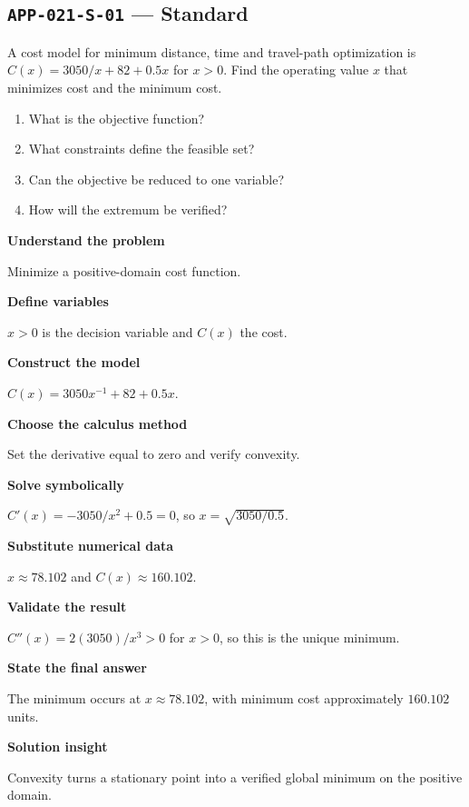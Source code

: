 \documentclass[11pt]{book}
\newcommand{\pid}[1]{\texttt{#1}}
\begin{document}
\subsection*{\pid{APP-021-S-01} — Standard}
\begin{problembox}
A cost model for minimum distance, time and travel-path optimization is $C(x)=3050/x+82+0.5x$ for $x>0$. Find the operating value $x$ that minimizes cost and the minimum cost.
\end{problembox}
\begin{promptbox}\begin{enumerate}
\item What is the objective function?
\item What constraints define the feasible set?
\item Can the objective be reduced to one variable?
\item How will the extremum be verified?
\end{enumerate}\end{promptbox}
\begin{solutionbox}
\textbf{Understand the problem}\par Minimize a positive-domain cost function.\par\medskip
\textbf{Define variables}\par $x>0$ is the decision variable and $C(x)$ the cost.\par\medskip
\textbf{Construct the model}\par $C(x)=3050x^{-1}+82+0.5x$.\par\medskip
\textbf{Choose the calculus method}\par Set the derivative equal to zero and verify convexity.\par\medskip
\textbf{Solve symbolically}\par $C'(x)=-3050/x^2+0.5=0$, so $x=\sqrt{3050/0.5}$.\par\medskip
\textbf{Substitute numerical data}\par $x\approx 78.102$ and $C(x)\approx 160.102$.\par\medskip
\textbf{Validate the result}\par $C''(x)=2(3050)/x^3>0$ for $x>0$, so this is the unique minimum.\par\medskip
\textbf{State the final answer}\par The minimum occurs at $x\approx 78.102$, with minimum cost approximately $160.102$ units.\par\medskip
\textbf{Solution insight}\par Convexity turns a stationary point into a verified global minimum on the positive domain.\par\medskip
\end{solutionbox}
\end{document}
